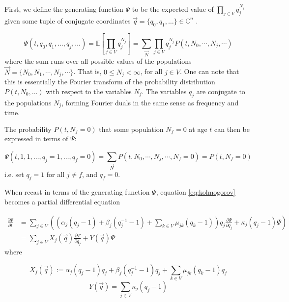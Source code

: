 \documentclass{article}
\begin{document}
First, we define the generating function $\Psi$ to be the expected value of $\prod_{j \in V}
q_j^{N_j}$ given some tuple of conjugate coordinates $\vec{q} = \{q_0, q_1, \dots\} \in
\mathbb{C}^n$ \cite{gfology}.

\begin{equation}
    \Psi(t,q_0,q_1,\dots,q_j,\dots) 
    = \mathbb{E}\left[\prod_{j \in V} q_j^{N_j}\right]
    = \sum_{\vec{N}} \prod_{j \in V} q_j^{N_j} 
        P(t, N_0, \cdots, N_j, \cdots)
\end{equation}
where the sum runs over all possible values of the populations $\vec{N} = \{N_0,
N_1, \cdots, N_j, \cdots\}$. That is, $0 \leq N_j < \infty$, for all $j \in V$.
One can note that this is essentially the Fourier transform of the probability
distribution $P(t,N_0,\dots)$ with respect to the variables $N_j$. The variables
$q_j$ are conjugate to the populations $N_j$, forming Fourier duals in the same
sense as frequency and time.

The probability $P(t,N_f = 0)$ that some population $N_f = 0$ at age $t$ can
then be expressed in terms of $\Psi$:

\begin{equation}
    \Psi(t,1,1,\dots,q_j = 1,\dots, q_f = 0)
    = \sum_{\vec{N}}
        P(t, N_0, \cdots, N_j, \cdots, N_f = 0)
    = P(t,N_f = 0)
    \label{eq:corner}
\end{equation}
i.e. set $q_j = 1$ for all $j \neq f$, and $q_f = 0$.

When recast in terms of the generating function $\Psi$, equation
\eqref{eq:kolmogorov} becomes a partial differential equation

\begin{align}
    \frac{\partial \Psi}{\partial t} &= 
    \sum_{j \in V} \left(
    \left(
    \alpha_j (q_j - 1)
    + \beta_j (q_j^{-1} - 1)
    + \sum_{k \in V} \mu_{jk} (q_k - 1) 
    \right) q_j \frac{\partial  \Psi}{\partial q_j}
    +\kappa_j (q_j - 1)  \Psi \right)
    \nonumber \\
    &= \sum_{j \in V} X_j(\vec{q}) \frac{\partial \Psi}{\partial q_j}
    + Y(\vec{q}) \Psi 
    \label{eq:wave}
\end{align}
where

\begin{equation}
    X_j(\vec{q}) :=
    \alpha_j (q_j - 1) q_j
    + \beta_j (q_j^{-1} - 1) q_j
    + \sum_{k \in V} \mu_{jk} (q_k - 1) q_j
\end{equation}
\begin{equation}
    Y(\vec{q}) = \sum_{j \in V}\kappa_j (q_j - 1)
\end{equation}
\end{document}

